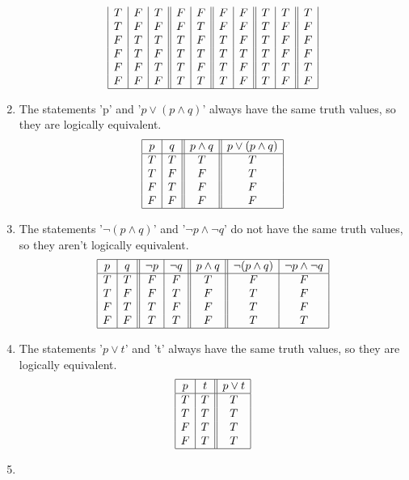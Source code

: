 \documentclass{article}
\begin{document}
\begin{enumerate}[label=\textbf{\arabic*.}]
\[\begin{array}{|c|c|c||c|c||c|c||c|c||c|}
T & F & T & F & F & F & F & T & T & T \\
T & F & F & F & T & F & F & T & F & F \\
F & T & T & T & F & T & F & T & F & F \\
F & T & F & T & T & T & T & T & F & F \\
F & F & T & T & F & T & F & T & T & T \\
F & F & F & T & T & T & F & T & F & F \\
\hline
\end{array}
\]
\item %
The statements 'p' and '$p \lor (p \land q)$' always have the same truth values, so they are logically equivalent.
\[
\begin{array}{|c|c||c||c|}
\hline
p & q & p \land q & p \lor (p \land q)\\
\hline
T & T & T & T \\
T & F & F & T \\
F & T & F & F \\
F & F & F & F \\
\hline
\end{array}
\]
\item %
The statements '$\neg (p \land q)$' and '$\neg p \land \neg q$' do not have the same truth values, so they aren't logically equivalent.
\[
\begin{array}{|c|c||c|c||c||c|c|}
\hline
p & q & \neg p & \neg q & p \land q & \neg (p \land q) & \neg p \land \neg q\\
\hline
T & T & F & F & T & F & F \\
T & F & F & T & F & T & F \\
F & T & T & F & F & T & F \\
F & F & T & T & F & T & T \\
\hline 
\end{array}
\]
\item %
The statements '$p \lor t$' and 't' always have the same truth values, so they are logically equivalent.
\[
\begin{array}{|c|c||c|}
\hline
p & t & p \lor t\\
\hline
T & T & T \\
T & T & T \\
F & T & T \\
F & T & T \\
\hline 
\end{array}
\]
\item %

\end{enumerate}
\end{document}
